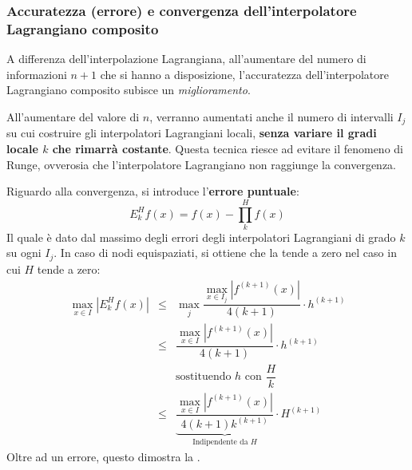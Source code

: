 \newpage

\subsubsection{Accuratezza (errore) e convergenza dell'interpolatore Lagrangiano composito}

A differenza dell'interpolazione Lagrangiana, all'aumentare del numero di informazioni $n+1$ che si hanno a disposizione, l'accuratezza dell'interpolatore Lagrangiano composito subisce un \emph{miglioramento}.

\highspace
All'aumentare del valore di $n$, verranno aumentati anche il numero di intervalli $I_{j}$ su cui costruire gli interpolatori Lagrangiani locali, \textbf{senza variare il gradi locale $k$ che rimarrà costante}. Questa tecnica riesce ad evitare il fenomeno di Runge, ovverosia che l'interpolatore Lagrangiano non raggiunge la convergenza.

\highspace
Riguardo alla convergenza, si introduce l'\textbf{errore puntuale}:
\begin{equation}
	E_{k}^{H}f\left(x\right) = f\left(x\right) - \displaystyle\prod_{k}^{H}f\left(x\right)
\end{equation}
Il quale è dato dal massimo degli errori degli interpolatori Lagrangiani di grado $k$ su ogni $I_{j}$. In caso di nodi equispaziati, si ottiene che la  tende a zero nel caso in cui $H$ tende a zero:
\begin{equation}\label{eq: stima dell'errore interpolatore Lagrangiano composito}
	\begin{array}{rcl}
		\underset{x \in I}{\max} \left| E_{k}^{H} f\left(x\right) \right| & \le & \underset{j}{\max} \dfrac{\underset{x \in I_{j}}{\max} \left|f^{\left(k+1\right)}\left(x\right)\right|}{4\left(k+1\right)} \cdot h^{\left(k+1\right)} \\ [1.5em]
		&\le& \dfrac{\underset{x \in I}{\max} \left|f^{\left(k+1\right)}\left(x\right)\right|}{4\left(k+1\right)} \cdot h^{\left(k+1\right)} \\ [1.5em]
		&& \text{sostituendo } h \text{ con } \dfrac{H}{k} \\ [1.5em]
		&\le& \underbrace{\dfrac{\underset{x \in I}{\max} \left|f^{\left(k+1\right)}\left(x\right)\right|}{4\left(k+1\right)k^{\left(k+1\right)}}}_{\text{Indipendente da }H} \cdot H^{\left(k+1\right)}
	\end{array}
\end{equation}
Oltre ad un errore, questo dimostra la .

